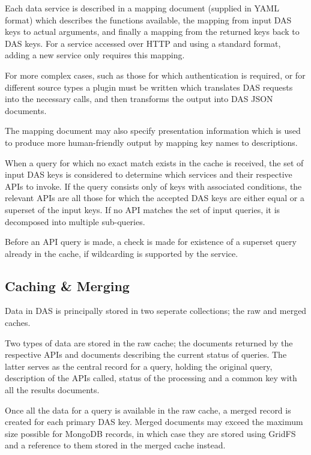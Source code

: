 \documentclass[a4paper]{jpconf}
\begin{document}
Each data service is described in a mapping document (supplied in YAML~\cite{yaml} format) which describes the functions available, the mapping from input DAS keys to actual arguments, and finally a mapping from the returned keys back to DAS keys. For a service accessed over HTTP and using a standard format, adding a new service only requires this mapping.

For more complex cases, such as those for which authentication is required, or for different source types a plugin must be written which translates DAS requests into the necessary calls, and then transforms the output into DAS JSON documents.

The mapping document may also specify presentation information which is used to produce more human-friendly output by mapping key names to descriptions.

When a query for which no exact match exists in the cache is received, the set of input DAS keys is considered to determine which services and their respective APIs to invoke. If the query consists only of keys with associated conditions, the relevant APIs are all those for which the accepted DAS keys are either equal or a superset of the input keys. If no API matches the set of input queries, it is decomposed into multiple sub-queries.

Before an API query is made, a check is made for existence of a superset query already in the cache, if wildcarding is supported by the service.

\subsection{\label{cachemerge}Caching \& Merging}

Data in DAS is principally stored in two seperate collections; the raw and merged caches.

Two types of data are stored in the raw cache; the documents returned by the respective APIs and documents describing the current status of queries. The latter serves as the central record for a query, holding the original query, description of the APIs called, status of the processing and a common key with all the results documents.

Once all the data for a query is available in the raw cache, a merged record is created for each primary DAS key. Merged documents may exceed the maximum size possible for MongoDB records, in which case they are stored using GridFS and a reference to them stored in the merged cache instead.
\end{document}
